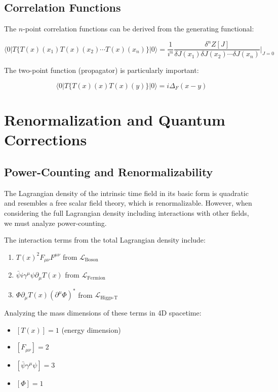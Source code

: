 \documentclass[12pt,a4paper]{article}
\newcommand{\Tfield}{T(x)}
\newcommand{\calL}{\mathcal{L}}
\begin{document}
	\subsection{Correlation Functions}
	\label{sec:korrelationsfunktionen}
	
	The $n$-point correlation functions can be derived from the generating functional:
	
	\begin{equation}
		\langle 0|T\{\Tfield(x_1)\Tfield(x_2)\cdots \Tfield(x_n)\}|0 \rangle = \frac{1}{i^n}\frac{\delta^n Z[J]}{\delta J(x_1) \delta J(x_2) \cdots \delta J(x_n)}\bigg|_{J=0}
	\end{equation}
	
	The two-point function (propagator) is particularly important:
	
	\begin{equation}
		\langle 0|T\{\Tfield(x)\Tfield(y)\}|0 \rangle = i\Delta_F(x-y)
	\end{equation}
	
	\section{Renormalization and Quantum Corrections}
	\label{sec:renormierung}
	
	\subsection{Power-Counting and Renormalizability}
	\label{sec:power_counting}
	
	The Lagrangian density of the intrinsic time field in its basic form is quadratic and resembles a free scalar field theory, which is renormalizable. However, when considering the full Lagrangian density including interactions with other fields, we must analyze power-counting.
	
	The interaction terms from the total Lagrangian density include:
	
	\begin{enumerate}
		\item $\Tfield^2 F_{\mu\nu}F^{\mu\nu}$ from $\calL_{\text{Boson}}$
		\item $\bar{\psi}i\gamma^{\mu}\psi\partial_{\mu}\Tfield$ from $\calL_{\text{Fermion}}$
		\item $\Phi\partial_{\mu}\Tfield(\partial^{\mu}\Phi)^*$ from $\calL_{\text{Higgs-T}}$
	\end{enumerate}
	
	Analyzing the mass dimensions of these terms in 4D spacetime:
	\begin{itemize}
		\item $[\Tfield] = 1$ (energy dimension)
		\item $[F_{\mu\nu}] = 2$
		\item $[\bar{\psi}\gamma^{\mu}\psi] = 3$
		\item $[\Phi] = 1$
	\end{itemize}
	
\end{document}
